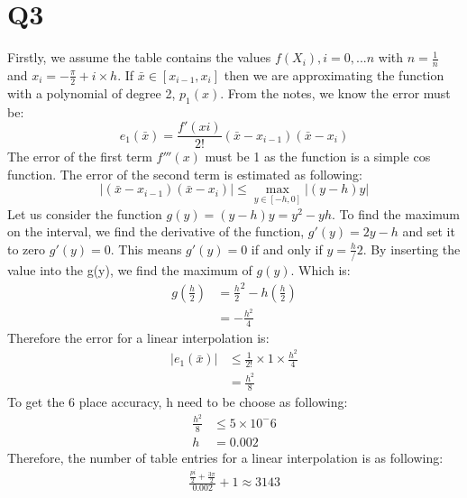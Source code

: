 \documentclass{article}
\begin{document}
\section{Q3}
Firstly, we assume the table contains the values $f(X_i),i = 0,...n$ with $n=\frac{1}{n}$ and $x_i = -\frac{\pi}{2} + i\times h$.  If $\bar{x} \in [x_{i-1}, x_i]$ then we are approximating the function with a polynomial of degree 2, $p_1(x)$. From the notes, we know the error must be:
\begin{equation*}
e_1(\bar{x}) = \frac{f'(xi)}{2!}(\bar{x} - x_{i-1})(\bar{x} - x_i)
\end{equation*}
The error of the first term $f'''(x)$ must be 1 as the function is a simple cos function. The error of the second term is estimated as following:
\begin{equation*}
|(\bar{x} - x_{i-1})(\bar{x} - x_i)| \leq \max_{y \in [-h, 0]}|(y-h)y|
\end{equation*}
Let us consider the function $g(y) = (y-h)y = y^2 - yh$. To find the maximum on the interval, we find the derivative of the function, $g'(y) = 2y - h$ and set it to zero $g'(y) = 0$. This means $g'(y) = 0$ if and only if $y = \frac{h}/2$. By inserting the value into the g(y), we find the maximum of $g(y)$. Which is:
\begin{equation*}
\begin{aligned}
g(\frac{h}{2}) &= {\frac{h}{2}}^2 - h(\frac{h}{2})\\
	&= -\frac{h^2}{4}
\end{aligned}
\end{equation*}
Therefore the error for a linear interpolation is:
\begin{equation*}
\begin{aligned}
|e_1(\bar{x})| &\leq \frac{1}{2!} \times 1 \times \frac{h^2}{4}\\
&= \frac{h^2}{8}
\end{aligned}
\end{equation*}
To get the 6 place accuracy, h need to be choose as following:
\begin{equation*}
\begin{aligned}
\frac{h^2}{8} &\leq 5 \times 10^-6\\
	h &= 0.002	
\end{aligned}
\end{equation*}
Therefore, the number of table entries for a linear interpolation is as following:
\begin{equation*}
\begin{aligned}
\frac{\frac{pi}{2} + \frac{3\pi}{2}}{0.002} + 1 \approx 3143
\end{aligned}
\end{equation*}
\end{document}
